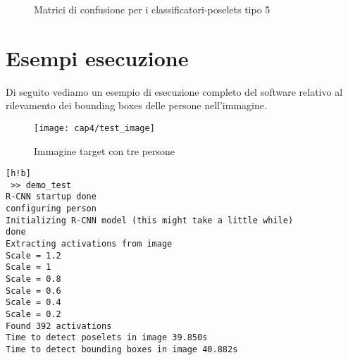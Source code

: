  
 
 \begin{figure}[h!b]
 \centering
 \hspace{5mm}
 \hspace{5mm}
 \vspace{5mm}
 
\hspace{5mm}
\hspace{5mm}
\caption{Matrici di confusione per i classificatori-poselets tipo 5}
\label{table-deepnet}
 \end{figure}
 

 \section{Esempi esecuzione}
 Di seguito vediamo un esempio di esecuzione completo del software relativo al rilevamento dei bounding boxes delle persone nell'immagine.\\
 \begin{figure}[h!b]
 \centering
 \texttt{[image: cap4/test\_image]}
 \caption{Immagine target con tre persone}
 \label{fig:my_label}
 \end{figure}
 
\begin{lstlisting}[h!b]
 >> demo_test
R-CNN startup done
configuring person
Initializing R-CNN model (this might take a little while)
done
Extracting activations from image
Scale = 1.2
Scale = 1
Scale = 0.8
Scale = 0.6
Scale = 0.4
Scale = 0.2
Found 392 activations
Time to detect poselets in image 39.850s
Time to detect bounding boxes in image 40.882s
 \end{lstlisting}
 

